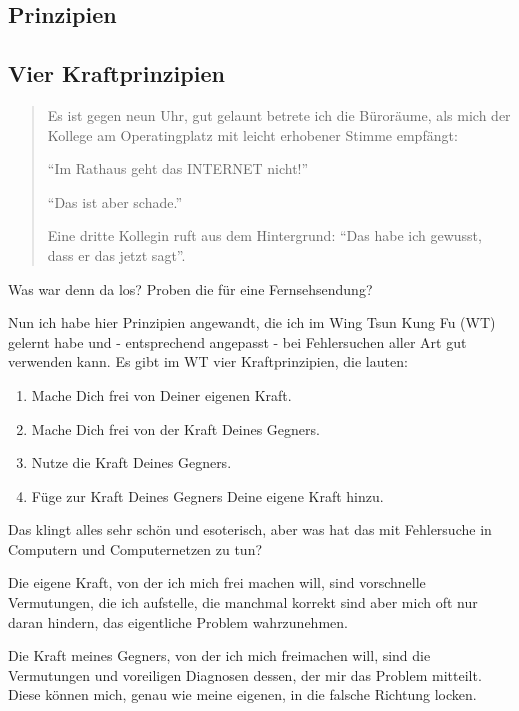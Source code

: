 \begin{normaltext}

\section{Prinzipien}
\label{sec:prinzipien}

\subsection{Vier Kraftprinzipien}

\begin{quote}
Es ist gegen neun Uhr, gut gelaunt betrete ich die Büroräume, als mich der
Kollege am Operatingplatz mit leicht erhobener Stimme empfängt:

``Im Rathaus geht das INTERNET nicht!''

``Das ist aber schade.''

Eine dritte Kollegin ruft aus dem Hintergrund: ``Das habe ich gewusst, dass er
das jetzt sagt''.
\end{quote}

Was war denn da los? Proben die für eine Fernsehsendung?

Nun ich habe hier Prinzipien angewandt, die ich im Wing Tsun Kung Fu (WT)
gelernt habe und - entsprechend angepasst - bei Fehlersuchen aller Art gut
verwenden kann. Es gibt im WT vier Kraftprinzipien, die lauten:

\begin{enumerate}
  \item Mache Dich frei von Deiner eigenen Kraft.
  \item Mache Dich frei von der Kraft Deines Gegners.
  \item Nutze die Kraft Deines Gegners.
  \item Füge zur Kraft Deines Gegners Deine eigene Kraft hinzu.
\end{enumerate}

Das klingt alles sehr schön und esoterisch, aber was hat das mit Fehlersuche
in Computern und Computernetzen zu tun?

Die eigene Kraft, von der ich mich frei machen will, sind vorschnelle
Vermutungen, die ich aufstelle, die manchmal korrekt sind aber mich oft nur
daran hindern, das eigentliche Problem wahrzunehmen.

Die Kraft meines Gegners, von der ich mich freimachen will, sind die
Vermutungen und voreiligen Diagnosen dessen, der mir das Problem mitteilt.
Diese können mich, genau wie meine eigenen, in die falsche Richtung locken.


\end{normaltext}
